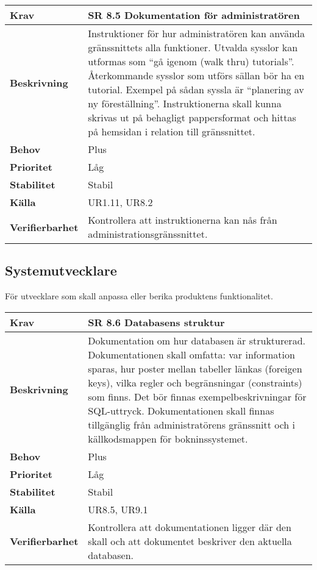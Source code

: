\documentclass[a4paper, twoside, 11pt, titlepage]{article}
\begin{document}
	\begin{tabular} { p{2.6cm} p{12.5cm} }
		\hline
		\sffamily\textbf{Krav} & \sffamily\textbf{SR 8.5 Dokumentation för administratören } \\
		\hline
		\sffamily\textbf{Beskrivning} & Instruktioner för hur administratören kan använda gränssnittets alla funktioner. Utvalda sysslor kan utformas som ``gå igenom (walk thru) tutorials''. Återkommande sysslor som utförs sällan bör ha en tutorial. Exempel på sådan syssla är ``planering av ny föreställning''. Instruktionerna skall kunna skrivas ut på behagligt pappersformat och hittas på hemsidan i relation till gränssnittet.  \\
		\hline
		\sffamily\textbf{Behov} & Plus  \\
		\hline
		\sffamily\textbf{Prioritet} & Låg  \\
		\hline
		\sffamily\textbf{Stabilitet} & Stabil  \\
		\hline
		\sffamily\textbf{Källa} & UR1.11, UR8.2  \\
		\hline
		\sffamily\textbf{Verifierbarhet} & Kontrollera att instruktionerna kan nås från administrationsgränssnittet.  \\
		\hline
	\end{tabular}


	\subsection{Systemutvecklare}


	För utvecklare som skall anpassa eller berika produktens funktionalitet.

	\begin{tabular} { p{2.6cm} p{12.5cm} }
		\hline
		\sffamily\textbf{Krav} & \sffamily\textbf{SR 8.6 Databasens struktur } \\
		\hline
		\sffamily\textbf{Beskrivning} & Dokumentation om hur databasen är strukturerad. Dokumentationen skall omfatta: var information sparas, hur poster mellan tabeller länkas (foreigen keys), vilka regler och begränsningar (constraints) som finns. Det bör finnas exempelbeskrivningar för SQL-uttryck. Dokumentationen skall finnas tillgänglig från administratörens gränssnitt och i källkodsmappen för bokninssystemet.  \\
		\hline
		\sffamily\textbf{Behov} & Plus  \\
		\hline
		\sffamily\textbf{Prioritet} & Låg  \\
		\hline
		\sffamily\textbf{Stabilitet} & Stabil  \\
		\hline
		\sffamily\textbf{Källa} & UR8.5, UR9.1  \\
		\hline
		\sffamily\textbf{Verifierbarhet} & Kontrollera att dokumentationen ligger där den skall och att dokumentet beskriver den aktuella databasen.  \\
		\hline
	\end{tabular}
	\vspace{6mm}
\end{document}
